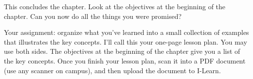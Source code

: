 This concludes the chapter.  Look at the objectives at the beginning of the chapter. Can you now do all the things you were promised? 


\begin{problem} 
Your assignment: organize what you've learned into a small collection of examples that illustrates the key concepts. I'll call this your one-page lesson plan. You may use both sides. The objectives at the beginning of the chapter give you a list of the key concepts. Once you finish your lesson plan, scan it into a PDF document (use any scanner on campus), and then upload the document to I-Learn.
\end{problem}



